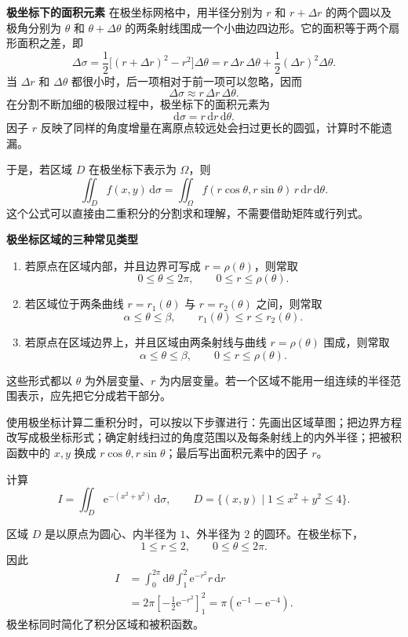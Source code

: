 \documentclass[fontset=fandol]{ctexart}
\newenvironment{custom}[1]{\par\noindent\textbf{#1}\quad}{\par\vspace{0.8em}}
\newcommand{\dd}{\mathrm{d}}
\newcommand{\ee}{\mathrm{e}}
\begin{document}
\begin{custom}{极坐标下的面积元素}
在极坐标网格中，用半径分别为 $r$ 和 $r+\Delta r$ 的两个圆以及极角分别为 $\theta$ 和 $\theta+\Delta\theta$ 的两条射线围成一个小曲边四边形。它的面积等于两个扇形面积之差，即
\[
\Delta\sigma
=\frac12\bigl[(r+\Delta r)^2-r^2\bigr]\Delta\theta
=r\,\Delta r\,\Delta\theta
+ \frac12(\Delta r)^2\Delta\theta.
\]
当 $\Delta r$ 和 $\Delta\theta$ 都很小时，后一项相对于前一项可以忽略，因而
\[
\Delta\sigma\approx r\,\Delta r\,\Delta\theta.
\]
在分割不断加细的极限过程中，极坐标下的面积元素为
\[
\boxed{\dd\sigma=r\,\dd r\,\dd\theta}.
\]
因子 $r$ 反映了同样的角度增量在离原点较远处会扫过更长的圆弧，计算时不能遗漏。
\end{custom}

于是，若区域 $D$ 在极坐标下表示为 $\Omega$，则
\[
\boxed{\iint_D f(x,y)\,\dd\sigma
=\iint_\Omega
f(r\cos\theta,r\sin\theta)\,r\,\dd r\,\dd\theta}.
\]
这个公式可以直接由二重积分的分割求和理解，不需要借助矩阵或行列式。

\begin{custom}{极坐标区域的三种常见类型}
\begin{enumerate}
\item 若原点在区域内部，并且边界可写成 $r=\rho(\theta)$，则常取
\[
0\leq\theta\leq2\pi,\qquad 0\leq r\leq\rho(\theta).
\]
\item 若区域位于两条曲线 $r=r_1(\theta)$ 与 $r=r_2(\theta)$ 之间，则常取
\[
\alpha\leq\theta\leq\beta,\qquad
r_1(\theta)\leq r\leq r_2(\theta).
\]
\item 若原点在区域边界上，并且区域由两条射线与曲线 $r=\rho(\theta)$ 围成，则常取
\[
\alpha\leq\theta\leq\beta,\qquad 0\leq r\leq\rho(\theta).
\]
\end{enumerate}
这些形式都以 $\theta$ 为外层变量、$r$ 为内层变量。若一个区域不能用一组连续的半径范围表示，应先把它分成若干部分。
\end{custom}

使用极坐标计算二重积分时，可以按以下步骤进行：先画出区域草图；把边界方程改写成极坐标形式；确定射线扫过的角度范围以及每条射线上的内外半径；把被积函数中的 $x,y$ 换成 $r\cos\theta,r\sin\theta$；最后写出面积元素中的因子 $r$。

\begin{example}[圆环区域上的二重积分]
计算
\[
I=\iint_D \ee^{-(x^2+y^2)}\,\dd\sigma,
\qquad D=\{(x,y)\mid1\leq x^2+y^2\leq4\}.
\]

区域 $D$ 是以原点为圆心、内半径为 $1$、外半径为 $2$ 的圆环。在极坐标下，
\[
1\leq r\leq2,\qquad0\leq\theta\leq2\pi.
\]
因此
\[
\begin{aligned}
I&=\int_0^{2\pi}\dd\theta\int_1^2\ee^{-r^2}r\,\dd r\\
&=2\pi\left[-\frac12\ee^{-r^2}\right]_1^2
=\pi(\ee^{-1}-\ee^{-4}).
\end{aligned}
\]
极坐标同时简化了积分区域和被积函数。
\end{example}
\end{document}
